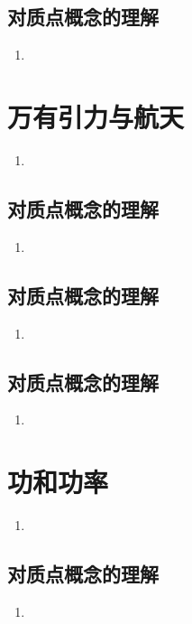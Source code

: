 \documentclass[cn,11pt]{elegantbook}
\begin{document}
\section{对质点概念的理解}
\begin{enumerate}
   \item 
\end{enumerate}


\chapter{万有引力与航天}
\begin{enumerate}
   \item 
\end{enumerate}

\section{对质点概念的理解}
\begin{enumerate}
   \item 
\end{enumerate}

\section{对质点概念的理解}
\begin{enumerate}
   \item 
\end{enumerate}

\section{对质点概念的理解}
\begin{enumerate}
   \item 
\end{enumerate}


\chapter{功和功率}
\begin{enumerate}
   \item 
\end{enumerate}

\section{对质点概念的理解}
\begin{enumerate}
   \item 
\end{enumerate}
\end{document}
